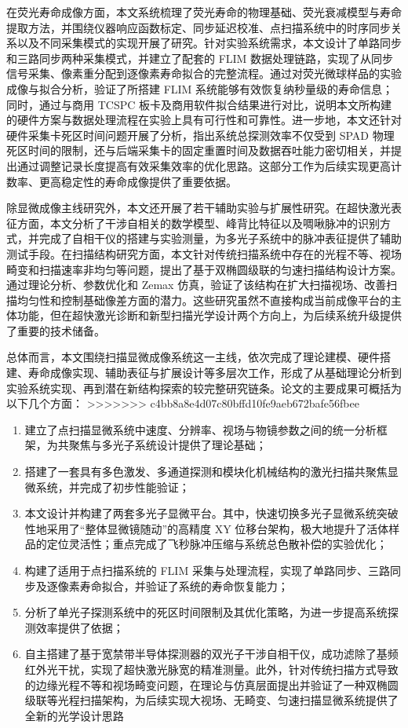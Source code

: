 在荧光寿命成像方面，本文系统梳理了荧光寿命的物理基础、荧光衰减模型与寿命提取方法，并围绕仪器响应函数标定、同步延迟校准、点扫描系统中的时序同步关系以及不同采集模式的实现开展了研究。针对实验系统需求，本文设计了单路同步和三路同步两种采集模式，并建立了配套的 FLIM 数据处理链路，实现了从同步信号采集、像素重分配到逐像素寿命拟合的完整流程。通过对荧光微球样品的实验成像与拟合分析，验证了所搭建 FLIM 系统能够有效恢复纳秒量级的寿命信息；同时，通过与商用 TCSPC 板卡及商用软件拟合结果进行对比，说明本文所构建的硬件方案与数据处理流程在实验上具有可行性和可靠性。进一步地，本文还针对硬件采集卡死区时间问题开展了分析，指出系统总探测效率不仅受到 SPAD 物理死区时间的限制，还与后端采集卡的固定重置时间及数据吞吐能力密切相关，并提出通过调整记录长度提高有效采集效率的优化思路。这部分工作为后续实现更高计数率、更高稳定性的寿命成像提供了重要依据。

除显微成像主线研究外，本文还开展了若干辅助实验与扩展性研究。在超快激光表征方面，本文分析了干涉自相关的数学模型、峰背比特征以及啁啾脉冲的识别方式，并完成了自相干仪的搭建与实验测量，为多光子系统中的脉冲表征提供了辅助测试手段。在扫描结构研究方面，本文针对传统扫描系统中存在的光程不等、视场畸变和扫描速率非均匀等问题，提出了基于双椭圆级联的匀速扫描结构设计方案。通过理论分析、参数优化和 Zemax 仿真，验证了该结构在扩大扫描视场、改善扫描均匀性和控制基础像差方面的潜力。这些研究虽然不直接构成当前成像平台的主体功能，但在超快激光诊断和新型扫描光学设计两个方向上，为后续系统升级提供了重要的技术储备。

总体而言，本文围绕扫描显微成像系统这一主线，依次完成了理论建模、硬件搭建、寿命成像实现、辅助表征与扩展设计等多层次工作，形成了从基础理论分析到实验系统实现、再到潜在新结构探索的较完整研究链条。论文的主要成果可概括为以下几个方面：
>>>>>>> c4bb8a8e4d07c80bffd10fe9aeb672bafe56fbee

\begin{enumerate}
    \item 建立了点扫描显微系统中速度、分辨率、视场与物镜参数之间的统一分析框架，为共聚焦与多光子系统设计提供了理论基础；
    \item 搭建了一套具有多色激发、多通道探测和模块化机械结构的激光扫描共聚焦显微系统，并完成了初步性能验证；
    \item 本文设计并构建了两套多光子显微平台。其中，快速切换多光子显微系统突破性地采用了``整体显微镜随动''的高精度 XY 位移台架构，极大地提升了活体样品的定位灵活性；重点完成了飞秒脉冲压缩与系统总色散补偿的实验优化；
    \item 构建了适用于点扫描系统的 FLIM 采集与处理流程，实现了单路同步、三路同步及逐像素寿命拟合，并验证了系统的寿命恢复能力；
    \item 分析了单光子探测系统中的死区时间限制及其优化策略，为进一步提高系统探测效率提供了依据；
    \item 自主搭建了基于宽禁带半导体探测器的双光子干涉自相干仪，成功滤除了基频红外光干扰，实现了超快激光脉宽的精准测量。此外，针对传统扫描方式导致的边缘光程不等和视场畸变问题，在理论与仿真层面提出并验证了一种双椭圆级联等光程扫描架构，为后续实现大视场、无畸变、匀速扫描显微系统提供了全新的光学设计思路
\end{enumerate}


